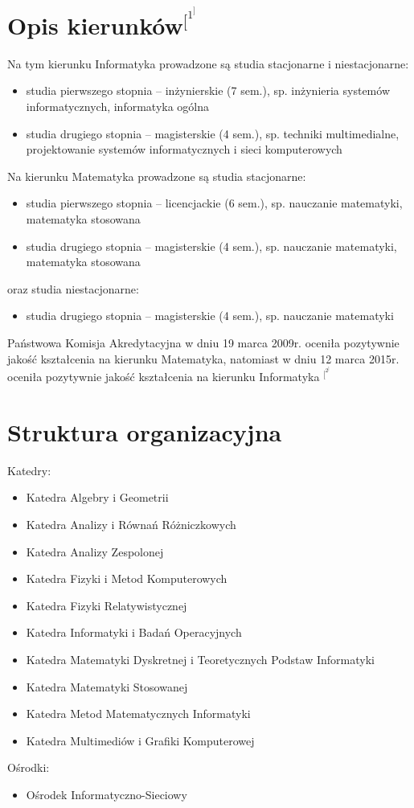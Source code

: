 \documentclass[a4paper,12pt]{article}
\begin{document}
\newpage
\section*{Opis kierunków$^[^1^]$}
Na tym kierunku Informatyka prowadzone są studia stacjonarne i niestacjonarne:

\begin{itemize}
\item studia pierwszego stopnia – inżynierskie (7 sem.), sp. inżynieria systemów informatycznych, informatyka
ogólna
\item studia drugiego stopnia – magisterskie (4 sem.), sp. techniki multimedialne, projektowanie systemów
informatycznych i sieci komputerowych
\end{itemize}

Na kierunku Matematyka prowadzone są studia stacjonarne:

\begin{itemize}
\item studia pierwszego stopnia – licencjackie (6 sem.), sp. nauczanie matematyki, matematyka stosowana
\item studia drugiego stopnia – magisterskie (4 sem.), sp. nauczanie matematyki, matematyka stosowana
\end{itemize}

oraz studia niestacjonarne:

\begin{itemize}
\item studia drugiego stopnia – magisterskie (4 sem.), sp. nauczanie matematyki
\end{itemize}

\vspace{0.2cm}Państwowa Komisja Akredytacyjna w dniu 19 marca 2009r. oceniła pozytywnie jakość kształcenia na\vspace{0.1cm} kierunku
Matematyka, natomiast w dniu 12 marca 2015r. oceniła pozytywnie jakość kształcenia na\vspace{0.1cm} kierunku
Informatyka $^[^2^]$

\section*{ Struktura organizacyjna}
Katedry:
\begin{itemize}
\item Katedra Algebry i Geometrii
\item Katedra Analizy i Równań Różniczkowych
\item Katedra Analizy Zespolonej
\item Katedra Fizyki i Metod Komputerowych
\item Katedra Fizyki Relatywistycznej
\item Katedra Informatyki i Badań Operacyjnych
\item Katedra Matematyki Dyskretnej i Teoretycznych Podstaw Informatyki
\item Katedra Matematyki Stosowanej
\item Katedra Metod Matematycznych Informatyki
\item Katedra Multimediów i Grafiki Komputerowej
\end{itemize}

Ośrodki:
\begin{itemize}
\item Ośrodek Informatyczno-Sieciowy
\end{itemize}
\end{document}
